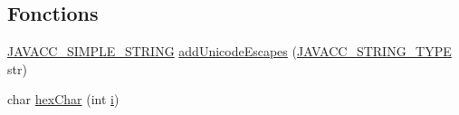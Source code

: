 \subsection*{Fonctions}
\begin{DoxyCompactItemize}
\item 
\hyperlink{_java_c_c_8h_ac82c9f0881bc263341157153e0f2ae27}{J\+A\+V\+A\+C\+C\+\_\+\+S\+I\+M\+P\+L\+E\+\_\+\+S\+T\+R\+I\+N\+G} \hyperlink{namespacevhdl_1_1parser_aa308525f8e56a065af0756a8633c49d0}{add\+Unicode\+Escapes} (\hyperlink{_java_c_c_8h_a7941da0682a76ffa9869d8458e166062}{J\+A\+V\+A\+C\+C\+\_\+\+S\+T\+R\+I\+N\+G\+\_\+\+T\+Y\+P\+E} str)
\item 
char \hyperlink{namespacevhdl_1_1parser_a356aaee0ada6db1f4262485a7637d6ae}{hex\+Char} (int \hyperlink{060__command__switch_8tcl_a8c90afd4641b25be86bd09983c3cbee0}{i})
\end{DoxyCompactItemize}
